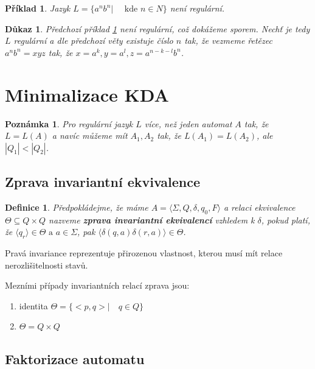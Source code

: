 \documentclass[10pt, a4paper, titlepage]{article}
\theoremstyle{note}
\newtheorem{definice}{\textbf{Definice}}
\newtheorem{dukaz}{\textbf{Důkaz}}
\newtheorem{priklad}{\textbf{Příklad}}
\newtheorem{poznamka}{\textbf{Poznámka}}
\begin{document}
\begin{priklad}\label{priklad-reg}
 Jazyk $L = \lbrace a^{n}b^{n} | \quad \text{ kde } n \in N \rbrace$ není regulární.
\end{priklad}

\begin{dukaz}
 Předchozí příklad \ref{priklad-reg} není regulární, což dokážeme sporem. Nechť je tedy $L$ regulární a dle předchozí
věty existuje číslo $n$ tak, že vezmeme řetězec $a^{n}b^{n} = xyz$ tak, že $x = a^{k}, y = a^{l}, z = a^{n-k-l}b^{n}$.
\end{dukaz}


\section{Minimalizace KDA}

\begin{poznamka}
Pro regulární jazyk $L$ více, než jeden automat $A$ tak, že $L = L(A)$ a navíc můžeme mít $A_{1}, A_{2}$ tak, že
$L(A_{1}) = L(A_{2})$, ale $|Q_{1}| < |Q_{2}|$.
\end{poznamka}

\subsection{Zprava invariantní ekvivalence}

\begin{definice}
Předpokládejme, že máme $A = \langle \Sigma, Q, \delta, q_{0}, F \rangle$ a relaci ekvivalence $\Theta \subseteq Q \times Q$ nazveme
\textbf{zprava invariantní ekvivalencí} vzhledem k $\delta$, pokud platí, že $\langle q_{r}  \rangle \in \Theta \text{ a } a \in \Sigma$,
pak $\langle  \delta(q, a) \delta(r, a) \rangle \in \Theta$.
\end{definice}

Pravá invariance reprezentuje přirozenou vlastnost, kterou musí mít relace nerozlišitelnosti stavů.

Mezními případy invariantních relací zprava jsou:
\begin{enumerate}
\item 
identita $\Theta = \lbrace <p,q> | \quad q \in Q \rbrace$
\item
$\Theta = Q \times Q$
\end{enumerate}

\subsection{Faktorizace automatu}
\end{document}
